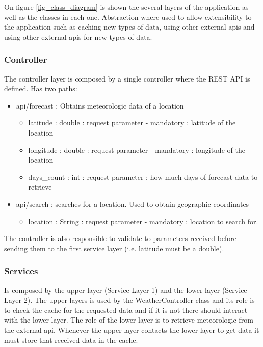 \documentclass[12pt]{article}
\begin{document}
On figure \ref{fig_class_diagram} is shown the several layers of the application as well as the
  classes in each one. Abstraction where used to allow extensibility to the application such as
  caching new types of data, using other external apis and using other external apis for new
  types of data.

\subsubsection{Controller}

The controller layer is composed by a single controller where the REST API is
  defined. Has two paths:
  \begin{itemize}
    \item api/forecast : Obtains meteorologic data of a location
      \begin{itemize}
        \item latitude : double : request parameter - mandatory : latitude of the location
        \item longitude : double : request parameter - mandatory : longitude of the location
        \item days\_count : int : request parameter : how much days of forecast data to retrieve
      \end{itemize}
    \item api/search : searches for a location. Used to obtain geographic coordinates
      \begin{itemize}
        \item location : String : request parameter - mandatory : location to search for.
      \end{itemize}
  \end{itemize}

The controller is also responsible to validate to parameters received before sending them to the
  first service layer (i.e. latitude must be a double).

\subsubsection{Services}

Is composed by the upper layer (Service Layer 1) and the lower layer (Service Layer 2). The upper layers
  is used by the WeatherController class and its role is to check the cache for the requested data and if
  it is not there should interact with the lower layer. The role of the lower layer is to retrieve
  meteorologic from the external api. Whenever the upper layer contacts the lower layer to
  get data it must store that received data in the cache.
\end{document}
